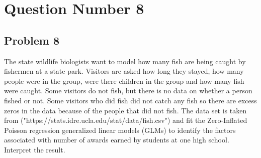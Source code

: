 \documentclass[12pt,a4paper]{report}
\begin{document}
\chapter*{Question Number 8}
\section*{Problem 8}

The state wildlife biologists want to model how many fish are being caught by fishermen at a state park. 
Visitors are asked how long they stayed, how many people were in the group, were there children in the group and how many fish were caught. 
Some visitors do not fish, but there is no data on whether a person fished or not.
Some visitors who did fish did not catch any fish so there are excess zeros in the data because of the people that did not fish. The data set is taken from ("https://stats.idre.ucla.edu/stat/data/fish.csv") and fit the Zero-Inflated Poisson regression generalized linear models (GLMs) to identify the factors associated with number of awards earned by students at one high school. 
Interpret the result.
\end{document}
